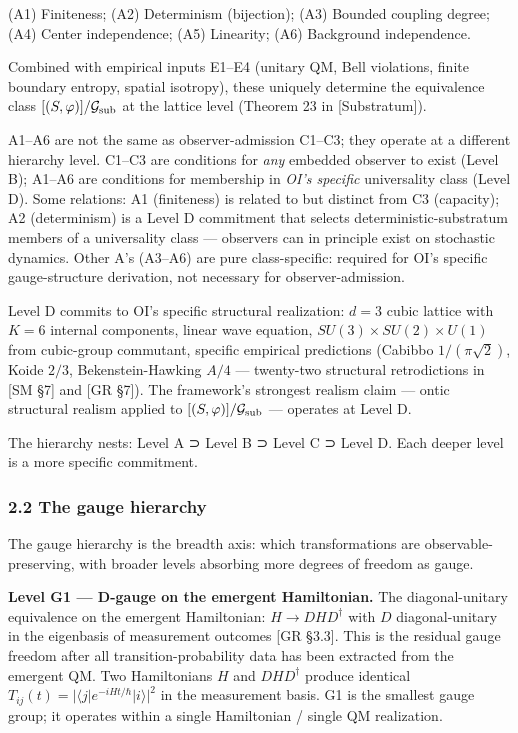 \documentclass[
]{article}
\begin{document}
(A1) Finiteness; (A2) Determinism (bijection); (A3) Bounded coupling
degree; (A4) Center independence; (A5) Linearity; (A6) Background
independence.

Combined with empirical inputs E1--E4 (unitary QM, Bell violations,
finite boundary entropy, spatial isotropy), these uniquely determine the
equivalence class \([(S, \varphi)]/\mathcal{G}_{\rm sub}\) at the
lattice level (Theorem 23 in {[}Substratum{]}).

A1--A6 are not the same as observer-admission C1--C3; they operate at a
different hierarchy level. C1--C3 are conditions for \emph{any} embedded
observer to exist (Level B); A1--A6 are conditions for membership in
\emph{OI's specific} universality class (Level D). Some relations: A1
(finiteness) is related to but distinct from C3 (capacity); A2
(determinism) is a Level D commitment that selects
deterministic-substratum members of a universality class --- observers
can in principle exist on stochastic dynamics. Other A's (A3--A6) are
pure class-specific: required for OI's specific gauge-structure
derivation, not necessary for observer-admission.

Level D commits to OI's specific structural realization: \(d=3\) cubic
lattice with \(K=6\) internal components, linear wave equation,
\(SU(3) \times SU(2) \times U(1)\) from cubic-group commutant, specific
empirical predictions (Cabibbo \(1/(\pi\sqrt{2})\), Koide \(2/3\),
Bekenstein-Hawking \(A/4\) --- twenty-two structural retrodictions in
{[}SM §7{]} and {[}GR §7{]}). The framework's strongest realism claim
--- ontic structural realism applied to
\([(S, \varphi)]/\mathcal{G}_{\rm sub}\) --- operates at Level D.

The hierarchy nests: Level A ⊃ Level B ⊃ Level C ⊃ Level D. Each deeper
level is a more specific commitment.

\hypertarget{the-gauge-hierarchy}{%
\subsubsection{2.2 The gauge hierarchy}\label{the-gauge-hierarchy}}

The gauge hierarchy is the breadth axis: which transformations are
observable-preserving, with broader levels absorbing more degrees of
freedom as gauge.

\textbf{Level G1 --- D-gauge on the emergent Hamiltonian.} The
diagonal-unitary equivalence on the emergent Hamiltonian:
\(H \to D H D^\dagger\) with \(D\) diagonal-unitary in the eigenbasis of
measurement outcomes {[}GR §3.3{]}. This is the residual gauge freedom
after all transition-probability data has been extracted from the
emergent QM. Two Hamiltonians \(H\) and \(DHD^\dagger\) produce
identical \(T_{ij}(t) = |\langle j|e^{-iHt/\hbar}|i\rangle|^2\) in the
measurement basis. G1 is the smallest gauge group; it operates within a
single Hamiltonian / single QM realization.
\end{document}
